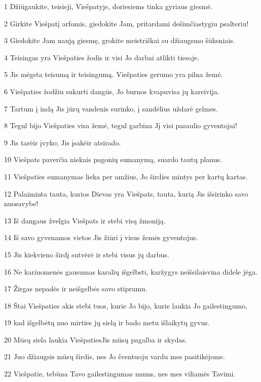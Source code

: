 \par 1 Džiūgaukite, teisieji, Viešpatyje, doriesiems tinka gyriaus giesmė. 
\par 2 Girkite Viešpatį arfomis, giedokite Jam, pritardami dešimčiastygiu psalteriu! 
\par 3 Giedokite Jam naują giesmę, grokite meistriškai su džiaugsmo šūksniais. 
\par 4 Teisingas yra Viešpaties žodis ir visi Jo darbai atlikti tiesoje. 
\par 5 Jis mėgsta teisumą ir teisingumą. Viešpaties gerumo yra pilna žemė. 
\par 6 Viešpaties žodžiu sukurti dangūs, Jo burnos kvapu­visa jų kareivija. 
\par 7 Tartum į indą Jis jūrų vandenis surinko, į sandėlius uždarė gelmes. 
\par 8 Tegul bijo Viešpaties visa žemė, tegul garbina Jį visi pasaulio gyventojai! 
\par 9 Jis tarė­ir įvyko; Jis įsakė­ir atsirado. 
\par 10 Viešpats paverčia niekais pagonių sumanymą, suardo tautų planus. 
\par 11 Viešpaties sumanymas lieka per amžius, Jo širdies mintys per kartų kartas. 
\par 12 Palaiminta tauta, kurios Dievas yra Viešpats, tauta, kurią Jis išsirinko savo nuosavybe! 
\par 13 Iš dangaus žvelgia Viešpats ir stebi visą žmoniją. 
\par 14 Iš savo gyvenamos vietos Jis žiūri į visus žemės gyventojus. 
\par 15 Jis kiekvieno širdį sutvėrė ir stebi visus jų darbus. 
\par 16 Ne kariuomenės gausumas karalių išgelbsti, karžygys neišsilaisvina didele jėga. 
\par 17 Žirgas nepadės ir neišgelbės savo stiprumu. 
\par 18 Štai Viešpaties akis stebi tuos, kurie Jo bijo, kurie laukia Jo gailestingumo, 
\par 19 kad išgelbėtų nuo mirties jų sielą ir bado metu išlaikytų gyvus. 
\par 20 Mūsų siela laukia Viešpaties­Jis mūsų pagalba ir skydas. 
\par 21 Juo džiaugsis mūsų širdis, nes Jo šventuoju vardu mes pasitikėjome. 
\par 22 Viešpatie, tebūna Tavo gailestingumas mums, nes mes viliamės Tavimi.




